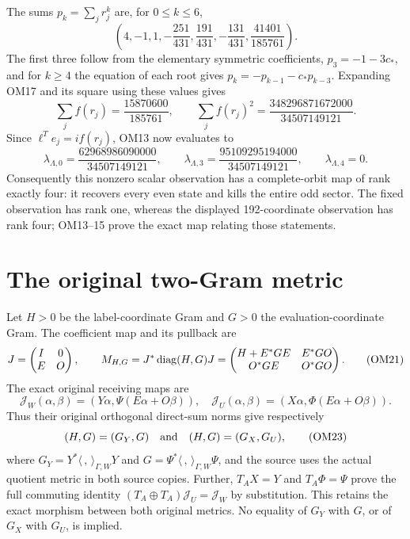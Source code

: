 \documentclass[11pt]{article}
\begin{document}
The sums $p_k=\sum_jr_j^k$ are, for $0\le k\le6$,
\[
\left(4,-1,1,-\frac{251}{431},\frac{191}{431},
             -\frac{131}{431},\frac{41401}{185761}\right).
\tag{OM18}
\]
The first three follow from the elementary symmetric coefficients,
$p_3=-1-3c_*$, and for $k\ge4$ the equation of each root gives
$p_k=-p_{k-1}-c_*p_{k-3}$.  Expanding OM17 and its square using
these values gives
\[
\sum_jf(r_j)=\frac{15870600}{185761},\qquad
\sum_jf(r_j)^2=\frac{348296871672000}{34507149121}.
\tag{OM19}
\]
Since $\ell^Te_j=if(r_j)$, OM13 now evaluates to
\[
\lambda_{\Lambda,0}=\frac{62968986090000}{34507149121},
\qquad
\lambda_{\Lambda,3}=\frac{95109295194000}{34507149121},
\qquad
\lambda_{\Lambda,4}=0.
\tag{OM20}
\]
Consequently this nonzero scalar observation has a complete-orbit
map of rank exactly four: it recovers every even state and kills
the entire odd sector.  The fixed observation has rank one, whereas
the displayed 192-coordinate observation has rank four; OM13--15
prove the exact map relating those statements.

\section{The original two-Gram metric}
Let $H>0$ be the label-coordinate Gram and $G>0$ the
evaluation-coordinate Gram.  The coefficient map and its pullback
are
\[
J=\begin{pmatrix}I&0\\E&O\end{pmatrix},\qquad
M_{H,G}=J^*\operatorname{diag}(H,G)J
=\begin{pmatrix}H+E^*GE&E^*GO\\O^*GE&O^*GO\end{pmatrix}.
\tag{OM21}
\]
The exact original receiving maps are
\[
\mathcal J_W(\alpha,\beta)
 =(Y\alpha,\Psi(E\alpha+O\beta)),\quad
\mathcal J_U(\alpha,\beta)
 =(X\alpha,\Phi(E\alpha+O\beta)).
\tag{OM22}
\]
Thus their original orthogonal direct-sum norms give respectively
\[
(H,G)=(G_Y,G)\quad\hbox{and}\quad(H,G)=(G_X,G_U),
\tag{OM23}
\]
where $G_Y=Y^*\langle\, ,\,\rangle_{\Gamma,W}Y$ and
$G=\Psi^*\langle\, ,\,\rangle_{\Gamma,W}\Psi$, and the source
uses the actual quotient metric in both source copies.  Further,
$T_AX=Y$ and $T_A\Phi=\Psi$ prove the full commuting identity
$(T_A\oplus T_A)\mathcal J_U=\mathcal J_W$ by substitution.
This retains the exact morphism between both original metrics.
No equality of $G_Y$ with $G$, or of $G_X$ with $G_U$, is implied.
\end{document}
